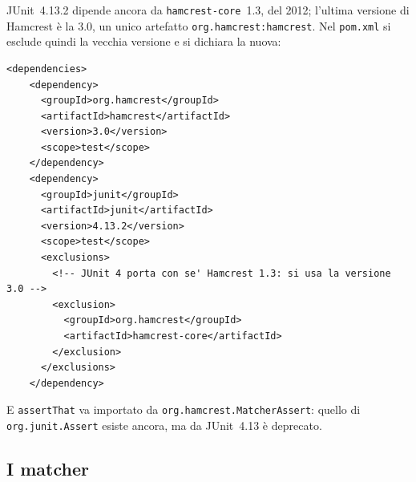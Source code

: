 JUnit~4.13.2 dipende ancora da \texttt{hamcrest-core}~1.3, del 2012; l'ultima versione di Hamcrest è la 3.0, un unico
artefatto \texttt{org.hamcrest:hamcrest}. Nel \texttt{pom.xml} si esclude quindi la vecchia versione e si dichiara la
nuova:

\begin{lstlisting}[style=xml, name=pom.xml, firstnumber=16]
  <dependencies>
    <dependency>
      <groupId>org.hamcrest</groupId>
      <artifactId>hamcrest</artifactId>
      <version>3.0</version>
      <scope>test</scope>
    </dependency>
    <dependency>
      <groupId>junit</groupId>
      <artifactId>junit</artifactId>
      <version>4.13.2</version>
      <scope>test</scope>
      <exclusions>
        <!-- JUnit 4 porta con se' Hamcrest 1.3: si usa la versione 3.0 -->
        <exclusion>
          <groupId>org.hamcrest</groupId>
          <artifactId>hamcrest-core</artifactId>
        </exclusion>
      </exclusions>
    </dependency>
\end{lstlisting}

E \texttt{assertThat} va importato da \texttt{org.hamcrest.MatcherAssert}: quello di \texttt{org.junit.Assert} esiste
ancora, ma da JUnit~4.13 è deprecato.

\subsection{I matcher}


